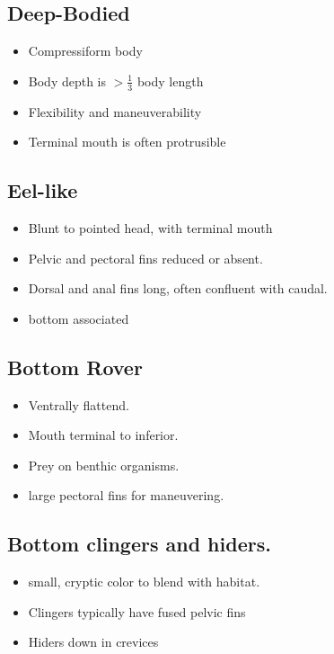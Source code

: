 \documentclass[11pt]{article}
\begin{document}
\subsection*{Deep-Bodied}

    \begin{itemize}
    	\item Compressiform body
    	\item Body depth is $>\frac{1}{3}$ body length  
    	\item Flexibility and maneuverability
    	\item Terminal mouth is often protrusible
    \end{itemize}

\subsection*{Eel-like}
    \begin{itemize}
    	\item Blunt to pointed head, with terminal mouth
    	\item Pelvic and pectoral fins reduced or absent.
    	\item Dorsal and anal fins long, often confluent with caudal.
    	\item bottom associated
    \end{itemize}

\subsection*{Bottom Rover}
	\begin{itemize}
		\item Ventrally flattend.
		\item Mouth terminal to inferior.
		\item Prey on benthic organisms.
		\item large pectoral fins for maneuvering.
	\end{itemize}

\subsection*{Bottom clingers and hiders.}

	\begin{itemize}
		\item small, cryptic color to blend with habitat.
		\item Clingers typically have fused pelvic fins
		\item Hiders down in crevices
	\end{itemize}
\end{document}
